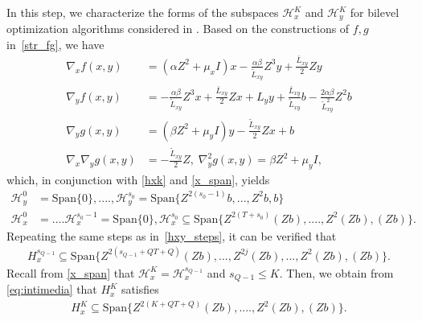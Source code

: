 \documentclass{osudissert96}
\begin{document}
\vspace{0.2cm}

In this step, we characterize the forms of  the subspaces $\mathcal{H}_x^K$ and $\mathcal{H}_y^K$
for bilevel optimization algorithms considered in . Based on the constructions of $f,g$ in~\cref{str_fg}, we have
\begin{align*}
\nabla_x f(x,y) &= (\alpha Z^2+\mu_x I)x -\frac{\alpha\beta}{\widetilde L_{xy}} Z^3y +\frac{\bar L_{xy}}{2}Zy\nonumber
\\ \nabla_y f(x,y) &= -\frac{\alpha \beta}{\widetilde L_{xy}} Z^3x + \frac{\bar L_{xy}}{2} Zx +L_y y +\frac{\bar L_{xy}}{\widetilde L_{xy}} b - \frac{2\alpha\beta}{\widetilde L_{xy}^2} Z^2 b
\\\nabla_y g(x,y) &= (\beta Z^2 + \mu_y I) y - \frac{\widetilde L_{xy}}{2} Zx + b
\\\nabla_x\nabla_y g(x,y) &= -\frac{\widetilde L_{xy}}{2} Z, \; \nabla_y^2g(x,y) = \beta Z^2 +\mu_y I, 
\end{align*}
which, in conjunction with \cref{hxk} and \cref{x_span}, yields 
\begin{align}\label{hxy_steps}
\mathcal{H}_y^0 &= \mbox{Span}\{0\}, ...., \mathcal{H}_y^{s_0} = \mbox{Span}\{Z^{2(s_0-1)}b,...,Z^2b,b\} \nonumber
\\\mathcal{H}_x^0 &= .... \mathcal{H}_x^{s_0-1} =\mbox{Span}\{0\}, \mathcal{H}_x^{s_0} \subseteq\mbox{Span}\{Z^{2(T+s_0)}(Zb),....,Z^2(Zb),(Zb)\}. 
\end{align}
Repeating the same steps as in~\cref{hxy_steps}, it can be verified that 
\begin{align}\label{eq:intimedia}
H_{x}^{s_{Q-1}} \subseteq \mbox{Span}\{Z^{2(s_{Q-1} + QT+Q)}(Zb),...,Z^{2j}(Zb),...,Z^2(Zb),(Zb)\}. 
\end{align}
Recall from \cref{x_span} that $\mathcal{H}_x^K = \mathcal{H}_x^{s_{Q-1}}$ and $s_{Q-1}\leq K$. Then, we obtain from \cref{eq:intimedia} that $H_{x}^{K }$ satisfies 
\begin{align}\label{eq:H_xK}
H_{x}^{K }\subseteq \mbox{Span}\{Z^{2(K+QT+Q)}(Zb),....,Z^2(Zb),(Zb) \}.
\end{align}
\vspace{0.2cm}
\end{document}
